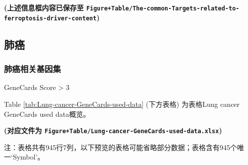 \documentclass[
]{article}
\begin{document}
\textbf{(上述信息框内容已保存至 \texttt{Figure+Table/The-common-Targets-related-to-ferroptosis-driver-content})}

\hypertarget{ux80baux764c}{%
\subsection{肺癌}\label{ux80baux764c}}

\hypertarget{ux80baux764cux76f8ux5173ux57faux56e0ux96c6}{%
\subsubsection{肺癌相关基因集}\label{ux80baux764cux76f8ux5173ux57faux56e0ux96c6}}

GeneCards Score \textgreater{} 3

Table \ref{tab:Lung-cancer-GeneCards-used-data} (下方表格) 为表格Lung cancer GeneCards used data概览。

\textbf{(对应文件为 \texttt{Figure+Table/Lung-cancer-GeneCards-used-data.xlsx})}

\begin{center}\begin{tcolorbox}[colback=gray!10, colframe=gray!50, width=0.9\linewidth, arc=1mm, boxrule=0.5pt]注：表格共有945行7列，以下预览的表格可能省略部分数据；表格含有945个唯一`Symbol'。
\end{tcolorbox}
\end{center}
\end{document}

